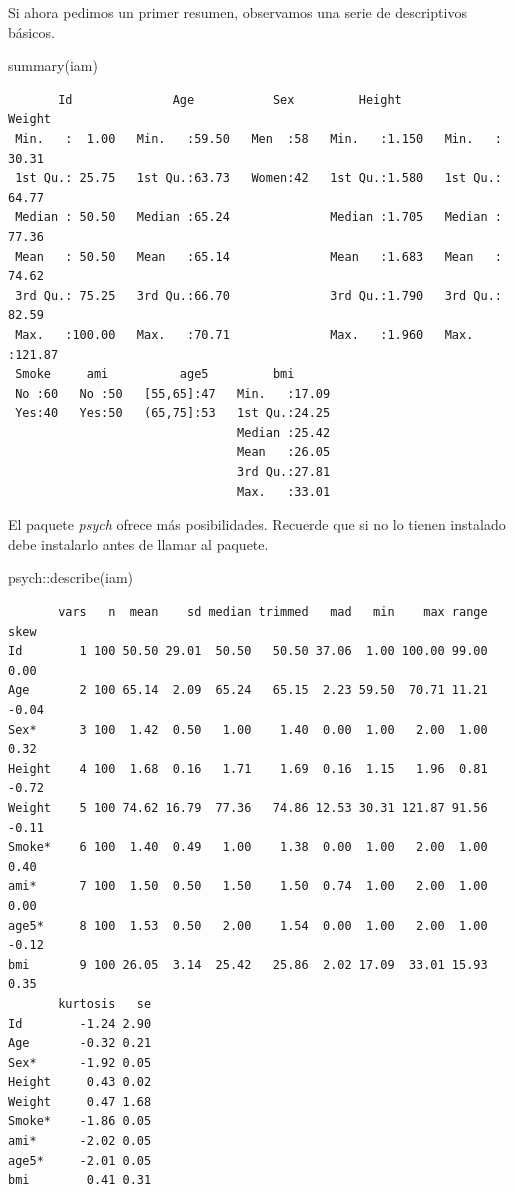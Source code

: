 \documentclass[
  letterpaper,
  DIV=11,
  numbers=noendperiod]{scrreprt}
\newenvironment{Shaded}{\begin{snugshade}}{\end{snugshade}}
\newcommand{\FunctionTok}[1]{\textcolor[rgb]{0.28,0.35,0.67}{#1}}
\newcommand{\NormalTok}[1]{\textcolor[rgb]{0.00,0.23,0.31}{#1}}
\newcommand{\SpecialCharTok}[1]{\textcolor[rgb]{0.37,0.37,0.37}{#1}}
\begin{document}
Si ahora pedimos un primer resumen, observamos una serie de descriptivos
básicos.

\begin{Shaded}
\begin{Highlighting}[]
\FunctionTok{summary}\NormalTok{(iam)}
\end{Highlighting}
\end{Shaded}

\begin{verbatim}
       Id              Age           Sex         Height          Weight      
 Min.   :  1.00   Min.   :59.50   Men  :58   Min.   :1.150   Min.   : 30.31  
 1st Qu.: 25.75   1st Qu.:63.73   Women:42   1st Qu.:1.580   1st Qu.: 64.77  
 Median : 50.50   Median :65.24              Median :1.705   Median : 77.36  
 Mean   : 50.50   Mean   :65.14              Mean   :1.683   Mean   : 74.62  
 3rd Qu.: 75.25   3rd Qu.:66.70              3rd Qu.:1.790   3rd Qu.: 82.59  
 Max.   :100.00   Max.   :70.71              Max.   :1.960   Max.   :121.87  
 Smoke     ami          age5         bmi       
 No :60   No :50   [55,65]:47   Min.   :17.09  
 Yes:40   Yes:50   (65,75]:53   1st Qu.:24.25  
                                Median :25.42  
                                Mean   :26.05  
                                3rd Qu.:27.81  
                                Max.   :33.01  
\end{verbatim}

El paquete \emph{psych} ofrece más posibilidades. Recuerde que si no lo
tienen instalado debe instalarlo antes de llamar al paquete.

\begin{Shaded}
\begin{Highlighting}[]
\NormalTok{psych}\SpecialCharTok{::}\FunctionTok{describe}\NormalTok{(iam)}
\end{Highlighting}
\end{Shaded}

\begin{verbatim}
       vars   n  mean    sd median trimmed   mad   min    max range  skew
Id        1 100 50.50 29.01  50.50   50.50 37.06  1.00 100.00 99.00  0.00
Age       2 100 65.14  2.09  65.24   65.15  2.23 59.50  70.71 11.21 -0.04
Sex*      3 100  1.42  0.50   1.00    1.40  0.00  1.00   2.00  1.00  0.32
Height    4 100  1.68  0.16   1.71    1.69  0.16  1.15   1.96  0.81 -0.72
Weight    5 100 74.62 16.79  77.36   74.86 12.53 30.31 121.87 91.56 -0.11
Smoke*    6 100  1.40  0.49   1.00    1.38  0.00  1.00   2.00  1.00  0.40
ami*      7 100  1.50  0.50   1.50    1.50  0.74  1.00   2.00  1.00  0.00
age5*     8 100  1.53  0.50   2.00    1.54  0.00  1.00   2.00  1.00 -0.12
bmi       9 100 26.05  3.14  25.42   25.86  2.02 17.09  33.01 15.93  0.35
       kurtosis   se
Id        -1.24 2.90
Age       -0.32 0.21
Sex*      -1.92 0.05
Height     0.43 0.02
Weight     0.47 1.68
Smoke*    -1.86 0.05
ami*      -2.02 0.05
age5*     -2.01 0.05
bmi        0.41 0.31
\end{verbatim}
\end{document}
